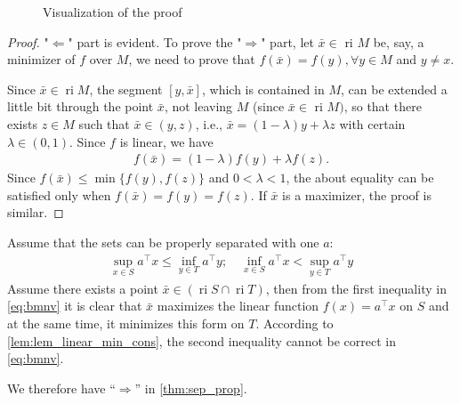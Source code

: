 \documentclass{article}
\newcommand{\ri}{\operatorname{ri}}
\begin{document}
\begin{figure}[H]

\caption{Visualization of the proof}\label{fig:conx_proo1}
\end{figure}

\begin{proof}\color{ForestGreen}
"$\Leftarrow$" part is evident. To prove the "$\Rightarrow$" part, let $\bar{x} \in$ ri $M$ be, say, a minimizer of $f$ over $M$, we need to prove that $f(\bar{x})=f(y), \forall y\in M$ and $y\ne x$. 

Since $\bar{x} \in \ri M$, the segment $[y, \bar{x}]$, which is contained in $M$, can be extended a little bit through the point $\bar{x}$, not leaving $M$ (since $\bar{x} \in$ ri $M)$, so that there exists $z \in M$ such that $\bar{x} \in(y, z)$, i.e., $\bar{x}=(1-\lambda) y+\lambda z$ with certain $\lambda \in(0,1) .$ Since $f$ is linear, we have
\begin{align}
f(\bar{x})=(1-\lambda) f(y)+\lambda f(z).\label{eq:tydi}
\end{align}
Since $f(\bar{x}) \leq \min \{f(y), f(z)\}$ and $0<\lambda<1$, the about equality can be satisfied only when $f(\bar{x})=f(y)=f(z)$. If $\bar{x}$ is a maximizer, the proof is similar.

\end{proof}

Assume that the sets can be properly separated with one $a$:
\begin{align}
\sup _{x \in S} a^{\top} x \leq \inf _{y \in T} a^{\top} y ; \quad \inf _{x \in S} a^{\top} x<\sup _{y \in T} a^{\top} y\label{eq:bmnv}
\end{align}
Assume there exists a point $\bar{x} \in(\operatorname{ri} S \cap \operatorname{ri} T)$,  then from the first inequality in \cref{eq:bmnv} it is clear that $\bar{x}$ maximizes the linear function $f(x)=a^{\top} x$ on $S$ and at the same time, it minimizes this form on $T$. According to \cref{lem:lem_linear_min_cons}, the second inequality cannot be correct in \cref{eq:bmnv}.

We therefore have ``$\Rightarrow$'' in \cref{thm:sep_prop}.
\end{document}
